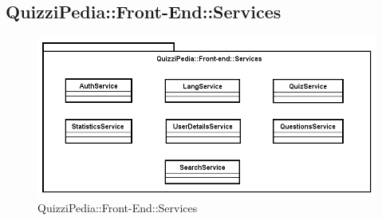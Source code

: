 \newpage
\subsection{QuizziPedia::Front-End::Services}
\begin{figure}[ht]
	\centering
	\includegraphics[scale=0.50]{UML/Package/QuizziPedia_Front-End_Services.png}
	\caption{QuizziPedia::Front-End::Services}
\end{figure} \FloatBarrier
